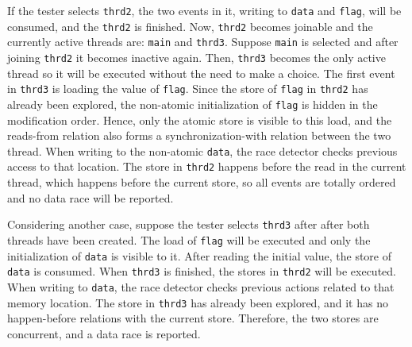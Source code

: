 If the tester selects \texttt{thrd2}, the two events in it, writing to \texttt{data} and \texttt{flag}, will be consumed, and the \texttt{thrd2} is finished. Now, \texttt{thrd2} becomes joinable and the currently active threads are: \texttt{main} and \texttt{thrd3}. Suppose \texttt{main} is selected and after joining \texttt{thrd2} it becomes inactive again. Then, \texttt{thrd3} becomes the only active thread so it will be executed without the need to make a choice. The first event in \texttt{thrd3} is loading the value of \texttt{flag}. Since the store of \texttt{flag} in \texttt{thrd2} has already been explored, the non-atomic initialization of \texttt{flag} is hidden in the modification order. Hence, only the atomic store is visible to this load, and the reads-from relation also forms a synchronization-with relation between the two thread. When writing to the non-atomic \texttt{data}, the race detector checks previous access to that location. The store in \texttt{thrd2} happens before the read in the current thread, which happens before the current store, so all events are totally ordered and no data race will be reported.

Considering another case, suppose the tester selects \texttt{thrd3} after after both threads have been created. The load of \texttt{flag} will be executed and only the initialization of \texttt{data} is visible to it. After reading the initial value, the store of \texttt{data} is consumed. When \texttt{thrd3} is finished, the stores in \texttt{thrd2} will be executed. When writing to \texttt{data}, the race detector checks previous actions related to that memory location. The store in \texttt{thrd3} has already been explored, and it has no happen-before relations with the current store. Therefore, the two stores are concurrent, and a data race is reported.

